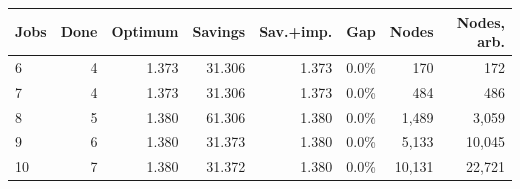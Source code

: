 \begin{tabular}{lrrrrrrr}
\toprule
\textbf{Jobs} & \textbf{Done} & \textbf{Optimum} & \textbf{Savings} & \textbf{Sav.+imp.} & \textbf{Gap} & \textbf{Nodes} & \textbf{Nodes, arb.} \\
\midrule
6 & 4 & 1.373 & 31.306 & 1.373 & 0.0\% & 170 & 172 \\
7 & 4 & 1.373 & 31.306 & 1.373 & 0.0\% & 484 & 486 \\
8 & 5 & 1.380 & 61.306 & 1.380 & 0.0\% & 1,489 & 3,059 \\
9 & 6 & 1.380 & 31.373 & 1.380 & 0.0\% & 5,133 & 10,045 \\
10 & 7 & 1.380 & 31.372 & 1.380 & 0.0\% & 10,131 & 22,721 \\
\bottomrule
\end{tabular}
